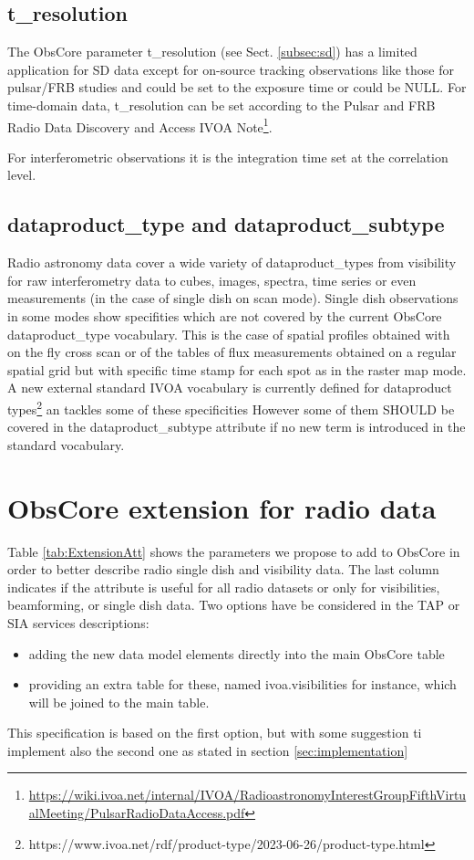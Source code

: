 \documentclass[11pt,a4paper]{ivoa}
\begin{document}
\subsection{t\_resolution}
The ObsCore parameter t\_resolution (see Sect. \ref{subsec:sd}) has a limited application for SD data
except for on-source tracking observations like those for pulsar/FRB studies and could be set to the
exposure time or could be NULL. For time-domain data, t\_resolution can be set according to the Pulsar
and FRB Radio Data Discovery and Access IVOA Note\footnote{\url{https://wiki.ivoa.net/internal/IVOA/RadioastronomyInterestGroupFifthVirtualMeeting/PulsarRadioDataAccess.pdf}}.

For interferometric observations it is the integration time set at the correlation level.


\subsection{dataproduct\_type and dataproduct\_subtype}

Radio astronomy data cover a wide variety of dataproduct\_types from visibility for raw interferometry data to cubes, images, spectra, time series or even measurements (in the case of single dish on scan mode). Single dish observations in some modes show specifities which are not covered by the current ObsCore dataproduct\_type vocabulary. This is the case of spatial profiles obtained with on the fly cross scan or of the tables of flux measurements obtained on a regular spatial grid but with specific time stamp for each spot as in the raster map  mode.
A new external standard IVOA vocabulary is currently defined for dataproduct types\footnote{https://www.ivoa.net/rdf/product-type/2023-06-26/product-type.html} an tackles some of these specificities
However some of them SHOULD be covered in the dataproduct\_subtype attribute if no new term is introduced in the standard vocabulary.

\section{ObsCore extension for radio data}

Table \ref{tab:ExtensionAtt} shows the %
parameters we propose to add to ObsCore in order to better describe radio single dish and visibility data.
The last column indicates if the attribute is useful for all radio datasets or only for visibilities, beamforming, or single dish data.
Two options have be considered in the TAP or SIA services descriptions: 
\begin{itemize}
\item adding the new data model elements directly into the main ObsCore table
\item providing an extra table for these, named ivoa.visibilities for instance,  which will 
be joined to the main table. 
\end{itemize}
This specification is based on the first option, but with some suggestion ti implement also the second one as stated in section \ref{sec:implementation}
\end{document}
